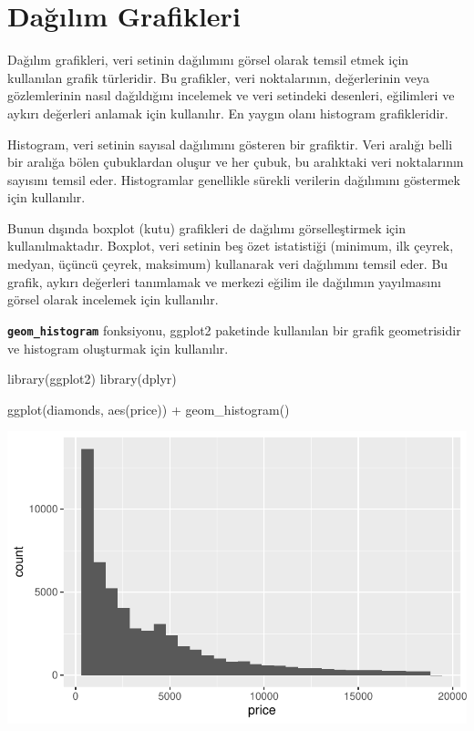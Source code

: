 \documentclass[
  letterpaper,
  DIV=11,
  numbers=noendperiod]{scrreprt}
\newenvironment{Shaded}{\begin{snugshade}}{\end{snugshade}}
\newcommand{\FunctionTok}[1]{\textcolor[rgb]{0.28,0.35,0.67}{#1}}
\newcommand{\NormalTok}[1]{\textcolor[rgb]{0.00,0.23,0.31}{#1}}
\newcommand{\SpecialCharTok}[1]{\textcolor[rgb]{0.37,0.37,0.37}{#1}}
\begin{document}
\section*{Dağılım Grafikleri}\label{daux11fux131lux131m-grafikleri}


Dağılım grafikleri, veri setinin dağılımını görsel olarak temsil etmek
için kullanılan grafik türleridir. Bu grafikler, veri noktalarının,
değerlerinin veya gözlemlerinin nasıl dağıldığını incelemek ve veri
setindeki desenleri, eğilimleri ve aykırı değerleri anlamak için
kullanılır. En yaygın olanı histogram grafikleridir.

Histogram, veri setinin sayısal dağılımını gösteren bir grafiktir. Veri
aralığı belli bir aralığa bölen çubuklardan oluşur ve her çubuk, bu
aralıktaki veri noktalarının sayısını temsil eder. Histogramlar
genellikle sürekli verilerin dağılımını göstermek için kullanılır.

Bunun dışında boxplot (kutu) grafikleri de dağılımı görselleştirmek için
kullanılmaktadır. Boxplot, veri setinin beş özet istatistiği (minimum,
ilk çeyrek, medyan, üçüncü çeyrek, maksimum) kullanarak veri dağılımını
temsil eder. Bu grafik, aykırı değerleri tanımlamak ve merkezi eğilim
ile dağılımın yayılmasını görsel olarak incelemek için kullanılır.

\textbf{\texttt{geom\_histogram}} fonksiyonu, ggplot2 paketinde
kullanılan bir grafik geometrisidir ve histogram oluşturmak için
kullanılır.

\begin{Shaded}
\begin{Highlighting}[]
\FunctionTok{library}\NormalTok{(ggplot2)}
\FunctionTok{library}\NormalTok{(dplyr)}

\FunctionTok{ggplot}\NormalTok{(diamonds, }\FunctionTok{aes}\NormalTok{(price)) }\SpecialCharTok{+}
  \FunctionTok{geom\_histogram}\NormalTok{()}
\end{Highlighting}
\end{Shaded}

\includegraphics{ggplot2_files/figure-pdf/unnamed-chunk-1-1.pdf}
\end{document}
